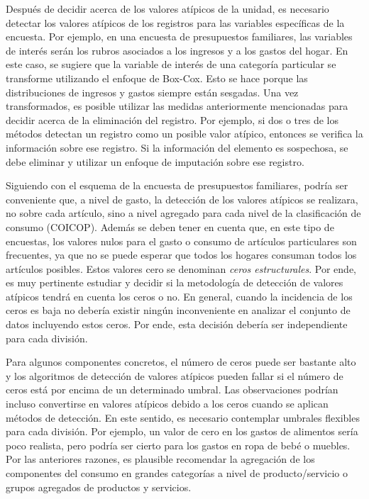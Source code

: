 \documentclass[
  12pt,
  spanish,
]{book}
\begin{document}
Después de decidir acerca de los valores atípicos de la unidad, es necesario detectar los valores atípicos de los registros para las variables específicas de la encuesta. Por ejemplo, en una encuesta de presupuestos familiares, las variables de interés serán los rubros asociados a los ingresos y a los gastos del hogar. En este caso, se sugiere que la variable de interés de una categoría particular se transforme utilizando el enfoque de Box-Cox. Esto se hace porque las distribuciones de ingresos y gastos siempre están sesgadas. Una vez transformados, es posible utilizar las medidas anteriormente mencionadas para decidir acerca de la eliminación del registro. Por ejemplo, si dos o tres de los métodos detectan un registro como un posible valor atípico, entonces se verifica la información sobre ese registro. Si la información del elemento es sospechosa, se debe eliminar y utilizar un enfoque de imputación sobre ese registro.

Siguiendo con el esquema de la encuesta de presupuestos familiares, podría ser conveniente que, a nivel de gasto, la detección de los valores atípicos se realizara, no sobre cada artículo, sino a nivel agregado para cada nivel de la clasificación de consumo (COICOP). Además se deben tener en cuenta que, en este tipo de encuestas, los valores nulos para el gasto o consumo de artículos particulares son frecuentes, ya que no se puede esperar que todos los hogares consuman todos los artículos posibles. Estos valores cero se denominan \emph{ceros estructurales}. Por ende, es muy pertinente estudiar y decidir si la metodología de detección de valores atípicos tendrá en cuenta los ceros o no. En general, cuando la incidencia de los ceros es baja no debería existir ningún inconveniente en analizar el conjunto de datos incluyendo estos ceros. Por ende, esta decisión debería ser independiente para cada división.

Para algunos componentes concretos, el número de ceros puede ser bastante alto y los algoritmos de detección de valores atípicos pueden fallar si el número de ceros está por encima de un determinado umbral. Las observaciones podrían incluso convertirse en valores atípicos debido a los ceros cuando se aplican métodos de detección. En este sentido, es necesario contemplar umbrales flexibles para cada división. Por ejemplo, un valor de cero en los gastos de alimentos sería poco realista, pero podría ser cierto para los gastos en ropa de bebé o muebles. Por las anteriores razones, es plausible recomendar la agregación de los componentes del consumo en grandes categorías a nivel de producto/servicio o grupos agregados de productos y servicios.
\end{document}
